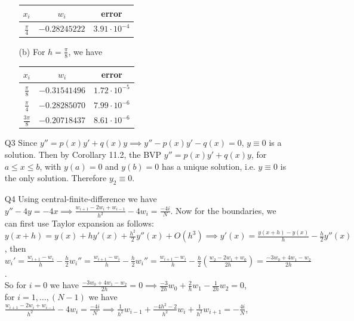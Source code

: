 \documentclass{article}
\begin{document}
\begin{itemize}
\begin{itemize}
\begin{tabular}{|c|c|c|}
                        \hline
                        $x_i$           & $w_i$         & error               \\
                        \hline
                        $\frac{\pi}{4}$ & $-0.28245222$ & $3.91\cdot 10^{-4}$ \\
                        \hline
                    \end{tabular}
              \item [(b)] For $h=\frac{\pi}{8}$, we have\\
                    \begin{tabular}{|c|c|c|}
                        \hline
                        $x_i$            & $w_i$         & error               \\
                        \hline
                        $\frac{\pi}{8}$  & $-0.31541496$ & $1.72\cdot 10^{-5}$ \\
                        \hline
                        $\frac{\pi}{4}$  & $-0.28285070$ & $7.99\cdot 10^{-6}$ \\
                        \hline
                        $\frac{3\pi}{8}$ & $-0.20718437$ & $8.61\cdot 10^{-6}$ \\
                        \hline
                    \end{tabular}
          \end{itemize}
    \item [Q3] Since $y''=p(x)y'+q(x)y\implies y''-p(x)y'-q(x)=0$, $y\equiv 0$ is a solution. Then by Corollary 11.2, the BVP $y''=p(x)y'+q(x)y$, for $a\leq x\leq b$, with $y(a)=0$ and $y(b)=0$ has a unique solution, i.e. $y\equiv 0$ is the only solution. Therefore $y_2\equiv 0$.
    \item [Q4] Using central-finite-difference we have $y''-4y=-4x\implies\frac{w_{i+1}-2w_i+w_{i-1}}{h^2}-4w_i=\frac{-4i}{N}$. Now for the boundaries, we can first use Taylor expansion as follows: $y(x+h)=y(x)+hy'(x)+\frac{h^2}{2}y''(x)+O(h^3)\implies y'(x)=\frac{y(x+h)-y(x)}{h}-\frac{h}{2}y''(x)$, then $w_i'=\frac{w_{i+1}-w_i}{h}-\frac{h}{2}w_i''=\frac{w_{i+1}-w_i}{h}-\frac{h}{2}w_i''=\frac{w_{i+1}-w_i}{h}-\frac{h}{2}(\frac{w_2-2w_1+w_0}{2h})=\frac{-3w_0+4w_1-w_2}{2h}$.\\
    So for $i=0$ we have $\frac{-3w_0+4w_1-w_2}{2h}=0\implies \frac{-3}{2h}w_0+\frac{2}{h}w_1-\frac{1}{2h}w_2=0$,\\
    for $i=1,\ldots,(N-1)$ we have $\frac{w_{i+1}-2w_i+w_{i-1}}{h^2}-4w_i=\frac{-4i}{N}\implies \frac{1}{h^2}w_{i-1}+\frac{-4h^2-2}{h^2}w_i+\frac{1}{h^2}w_{i+1}=-\frac{4i}{N}$,\\

\end{itemize}
\end{document}

